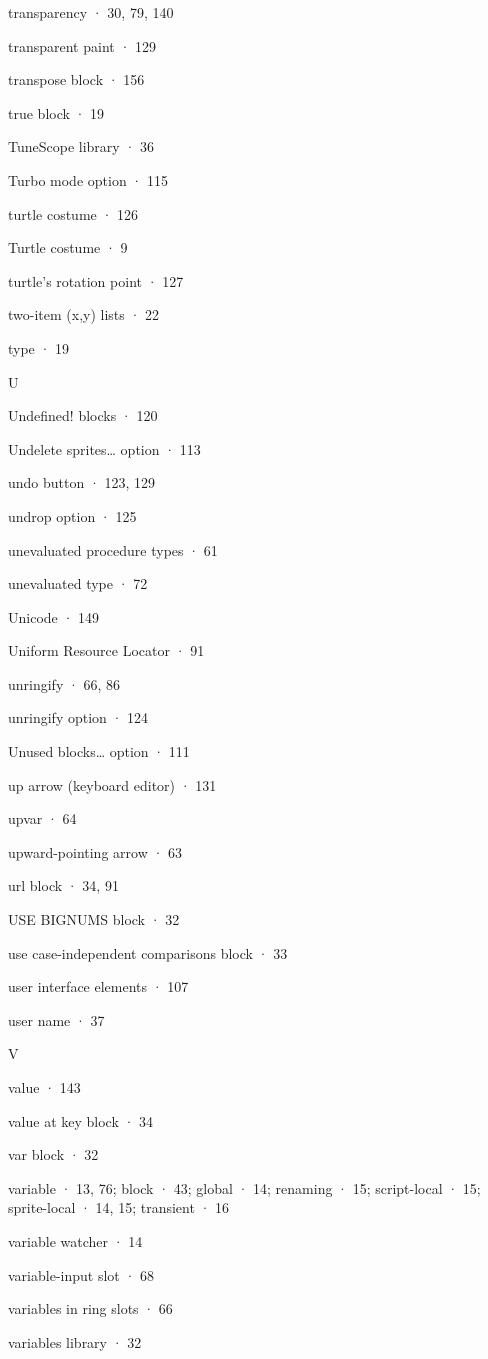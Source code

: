 \documentclass[
  letterpaper,
]{book}
\begin{document}
transparency · 30, 79, 140

transparent paint · 129

transpose block · 156

true block · 19

TuneScope library · 36

Turbo mode option · 115

turtle costume · 126

Turtle costume · 9

turtle's rotation point · 127

two-item (x,y) lists · 22

type · 19

U

Undefined! blocks · 120

Undelete sprites\ldots{} option · 113

undo button · 123, 129

undrop option · 125

unevaluated procedure types · 61

unevaluated type · 72

Unicode · 149

Uniform Resource Locator · 91

unringify · 66, 86

unringify option · 124

Unused blocks\ldots{} option · 111

up arrow (keyboard editor) · 131

upvar · 64

upward-pointing arrow · 63

url block · 34, 91

USE BIGNUMS block · 32

use case-independent comparisons block · 33

user interface elements · 107

user name · 37

V

value · 143

value at key block · 34

var block · 32

variable · 13, 76; block · 43; global · 14; renaming · 15; script-local
· 15; sprite-local · 14, 15; transient · 16

variable watcher · 14

variable-input slot · 68

variables in ring slots · 66

variables library · 32
\end{document}
